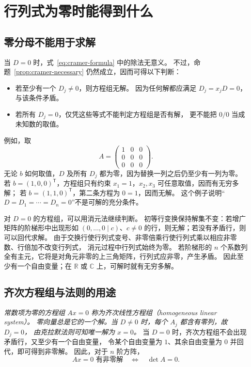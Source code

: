 \documentclass[UTF8,12pt,a4paper,fontset=fandol]{ctexart}
\begin{document}
\section{行列式为零时能得到什么}

\subsection{零分母不能用于求解}

当 $D=0$ 时，式~\eqref{eq:cramer-formula} 中的除法无意义。
不过，命题~\ref{prop:cramer-necessary} 仍然成立，因而可得以下判断：
\begin{itemize}
  \item 若至少有一个 $D_j\ne0$，则方程组无解。
  因为任何解都应满足 $D_j=x_jD=0$，与该条件矛盾。
  \item 若所有 $D_j=0$，仅凭这些等式不能判定方程组是否有解，
  更不能把 $0/0$ 当成未知数的取值。
\end{itemize}

例如，取
\[
  A=\begin{pmatrix}1&0&0\\0&0&0\\0&0&0\end{pmatrix}.
\]
无论 $b$ 如何取值，$D$ 及所有 $D_j$ 都为零，因为替换一列之后仍至少有一列为零。
若 $b=(1,0,0)^{\mathsf T}$，方程组只有约束 $x_1=1$，$x_2,x_3$ 可任意取值，因而有无穷多解；
若 $b=(1,1,0)^{\mathsf T}$，第二条方程为 $0=1$，因而无解。
这个例子说明“$D=D_1=\cdots=D_n=0$”不是可解的充分条件。

对 $D=0$ 的方程组，可以用消元法继续判断。
初等行变换保持解集不变：若增广矩阵的阶梯形中出现形如
$(0,\ldots,0\mid c)$、$c\ne0$ 的行，则无解；若没有矛盾行，则可以回代求解。
由于交换行使行列式变号、非零倍乘行使行列式乘以相应非零数、行倍加不改变行列式，
消元过程中行列式始终为零。
若阶梯形的 $n$ 个系数列全有主元，它将是对角元非零的上三角矩阵，行列式应非零，产生矛盾。
因此至少有一个自由变量；在 $\mathbb R$ 或 $\mathbb C$ 上，可解时就有无穷多解。

\subsection{齐次方程组与法则的用途}

\emph{常数项为零的方程组 $Ax=0$ 称为\emph{齐次线性方程组}（homogeneous linear system）。
零向量总是它的一个解。当 $D\ne0$ 时，每个 $A_j$ 都含有零列，故 $D_j=0$，
由克拉默法则可知唯一解为 $x=0$。}
当 $D=0$ 时，齐次方程组不会出现矛盾行，又至少有一个自由变量，
令某个自由变量为 $1$、其余自由变量为 $0$ 并回代，即可得到非零解。
因此，对于 $n$ 阶方阵，
\[
  Ax=0\text{ 有非零解}\quad\Longleftrightarrow\quad\det A=0.
\]
\end{document}
